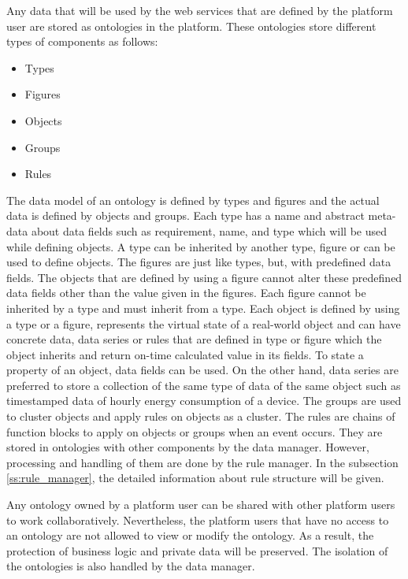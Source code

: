 Any data that will be used by the web services that are defined by the platform user are stored as ontologies in the platform. These ontologies store different types of components as follows:

\begin{itemize}
  \item Types
  \item Figures
  \item Objects
  \item Groups
  \item Rules
\end{itemize}

The data model of an ontology is defined by types and figures and the actual data is defined by objects and groups. Each type has a name and abstract meta-data about data fields such as requirement, name, and type which will be used while defining objects. A type can be inherited by another type, figure or can be used to define objects. The figures are just like types, but, with predefined data fields. The objects that are defined by using a figure cannot alter these predefined data fields other than the value given in the figures. Each figure cannot be inherited by a type and must inherit from a type. Each object is defined by using a type or a figure, represents the virtual state of a real-world object and can have concrete data, data series or rules that are defined in type or figure which the object inherits and return on-time calculated value in its fields. To state a property of an object, data fields can be used. On the other hand, data series are preferred to store a collection of the same type of data of the same object such as timestamped data of hourly energy consumption of a device. The groups are used to cluster objects and apply rules on objects as a cluster. The rules are chains of function blocks to apply on objects or groups when an event occurs. They are stored in ontologies with other components by the data manager. However, processing and handling of them are done by the rule manager. In the subsection \ref{ss:rule_manager}, the detailed information about rule structure will be given.

Any ontology owned by a platform user can be shared with other platform users to work collaboratively. Nevertheless, the platform users that have no access to an ontology are not allowed to view or modify the ontology. As a result, the protection of business logic and private data will be preserved. The isolation of the ontologies is also handled by the data manager. 

